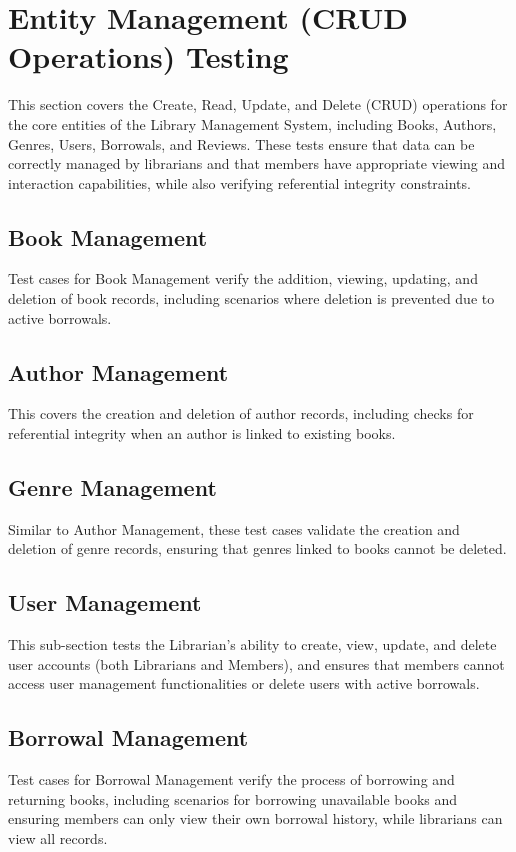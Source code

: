 \section{Entity Management (CRUD Operations) Testing}
This section covers the Create, Read, Update, and Delete (CRUD) operations for the core entities of the Library Management System, including Books, Authors, Genres, Users, Borrowals, and Reviews. These tests ensure that data can be correctly managed by librarians and that members have appropriate viewing and interaction capabilities, while also verifying referential integrity constraints.

\subsection{Book Management}
Test cases for Book Management verify the addition, viewing, updating, and deletion of book records, including scenarios where deletion is prevented due to active borrowals.

\subsection{Author Management}
This covers the creation and deletion of author records, including checks for referential integrity when an author is linked to existing books.

\subsection{Genre Management}
Similar to Author Management, these test cases validate the creation and deletion of genre records, ensuring that genres linked to books cannot be deleted.

\subsection{User Management}
This sub-section tests the Librarian's ability to create, view, update, and delete user accounts (both Librarians and Members), and ensures that members cannot access user management functionalities or delete users with active borrowals.

\subsection{Borrowal Management}
Test cases for Borrowal Management verify the process of borrowing and returning books, including scenarios for borrowing unavailable books and ensuring members can only view their own borrowal history, while librarians can view all records.

